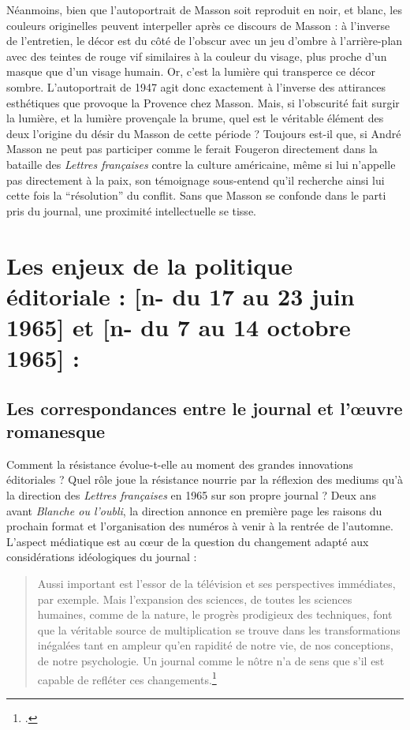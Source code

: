 Néanmoins, bien que l’autoportrait de Masson soit reproduit en noir, et blanc, les couleurs originelles peuvent interpeller après ce discours de Masson : à l’inverse de l’entretien, le décor est du côté de l’obscur avec un jeu d’ombre à l’arrière-plan avec des teintes de rouge vif similaires à la couleur du visage, plus proche d’un masque que d’un visage humain. Or, c’est la lumière qui transperce ce décor sombre. L’autoportrait de 1947 agit donc exactement à l’inverse des attirances esthétiques que provoque la Provence chez Masson. Mais, si l’obscurité fait surgir la lumière, et la lumière provençale la brume, quel est le véritable élément des deux l’origine du désir du Masson de cette période ? Toujours est-il que, si André Masson ne peut pas participer comme le ferait Fougeron directement dans la bataille des \emph{Lettres françaises }contre la culture américaine, même si lui n’appelle pas directement à la paix, son témoignage sous-entend qu’il recherche ainsi lui cette fois la \enquote{résolution} du conflit. Sans que Masson se confonde dans le parti pris du journal, une proximité intellectuelle se tisse.  

\section{Les enjeux de la politique éditoriale : [n- du 17 au 23 juin 1965] et  [n- du 7 au 14 octobre 1965] :}

\subsection{Les correspondances entre le journal et l'\oe{}uvre romanesque}

Comment la résistance évolue-t-elle au moment des grandes innovations éditoriales ? Quel rôle joue la résistance nourrie par la réflexion des mediums qu’à la direction des \emph{Lettres françaises} en 1965 sur son propre journal ? Deux ans avant \emph{Blanche ou l’oubli}, la direction annonce en première page les raisons du prochain format et l'organisation des numéros à venir à la rentrée de l’automne. L’aspect médiatique est au c\oe{}ur de la question du changement adapté aux considérations idéologiques du journal :

\begin{quote}
Aussi important est l’essor de la télévision et ses perspectives immédiates, par exemple. Mais l’expansion des sciences, de toutes les sciences humaines, comme de la nature, le progrès prodigieux des techniques, font que la véritable source de multiplication se trouve dans les transformations inégalées tant en ampleur qu’en rapidité de notre vie, de nos conceptions, de notre psychologie. Un journal comme le nôtre n’a de sens que s’il est capable de refléter ces changements.\footcite{nouvelleformule}\end{quote}


